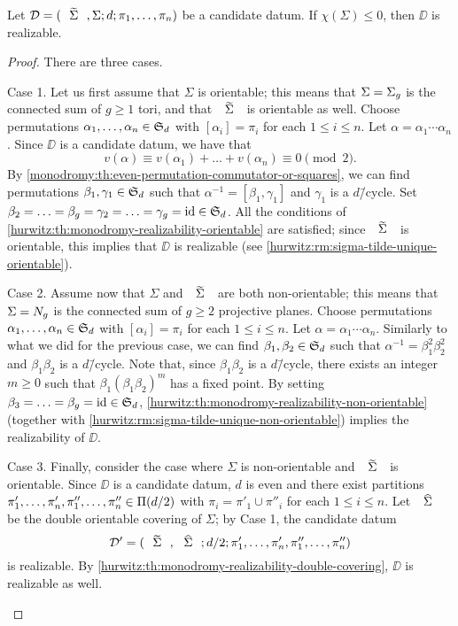 \begin{theorem}\label{monodromy:th:realizability-nonpositive-chi}
Let $\DD=\datum{\tSigma,\Sigma}{d}{\pi_1,\ldots,\pi_n}$ be a candidate datum. If $\chi(\Sigma)\le 0$, then $\DD$ is realizable.
\end{theorem}
\begin{proof}
There are three cases.
\begin{sideline}{Case 1.}
Let us first assume that $\Sigma$ is orientable; this means that $\Sigma=\Sigma_{g}$ is the connected sum of $g\ge 1$ tori, and that $\tSigma$ is orientable as well. Choose permutations $\alpha_1,\ldots,\alpha_n\in\symgroup[d]$ with $[\alpha_i]=\pi_i$ for each $1\le i\le n$. Let $\alpha=\alpha_1\cdots\alpha_n$. Since $\DD$ is a candidate datum, we have that
\[
v(\alpha)\equiv v(\alpha_1)+\ldots+v(\alpha_n)\equiv 0\pmod{2}.
\]
By \cref{monodromy:th:even-permutation-commutator-or-squares}, we can find permutations $\beta_1,\gamma_1\in\symgroup[d]$ such that $\alpha^{-1}=[\beta_1,\gamma_1]$ and $\gamma_1$ is a $d$\=/cycle. Set $\beta_2=\ldots=\beta_g=\gamma_2=\ldots=\gamma_g=\id\in\symgroup[d]$. All the conditions of \cref{hurwitz:th:monodromy-realizability-orientable} are satisfied; since $\tSigma$ is orientable, this implies that $\DD$ is realizable (see \cref{hurwitz:rm:sigma-tilde-unique-orientable}).
\end{sideline}
\begin{sideline}{Case 2.}
Assume now that $\Sigma$ and $\tSigma$ are both non-orientable; this means that $\Sigma=N_{g}$ is the connected sum of $g\ge 2$ projective planes. Choose permutations $\alpha_1,\ldots,\alpha_n\in\symgroup[d]$ with $[\alpha_i]=\pi_i$ for each $1\le i\le n$. Let $\alpha=\alpha_1\cdots\alpha_n$. Similarly to what we did for the previous case, we can find $\beta_1,\beta_2\in\symgroup[d]$ such that $\alpha^{-1}=\beta_1^2\beta_2^2$ and $\beta_1\beta_2$ is a $d$\=/cycle. Note that, since $\beta_1\beta_2$ is a $d$\=/cycle, there exists an integer $m\ge 0$ such that $\beta_1(\beta_1\beta_2)^m$ has a fixed point. By setting $\beta_3=\ldots=\beta_g=\id\in\symgroup[d]$, \cref{hurwitz:th:monodromy-realizability-non-orientable} (together with \cref{hurwitz:rm:sigma-tilde-unique-non-orientable}) implies the realizability of $\DD$.
\end{sideline}
\begin{sideline}{Case 3.}
Finally, consider the case where $\Sigma$ is non-orientable and $\tSigma$ is orientable. Since $\DD$ is a candidate datum, $d$ is even and there exist partitions $\pi'_1,\ldots,\pi'_n,\pi''_1,\ldots,\pi''_n\in\Pi(d/2)$ with $\pi_i=\pi'_1\cup\pi''_i$ for each $1\le i\le n$. Let $\hSigma$ be the double orientable covering of $\Sigma$; by Case 1, the candidate datum
\[
\DD'=\datum{\tSigma,\hSigma}{d/2}{\pi'_1,\ldots,\pi'_n,\pi''_1,\ldots,\pi''_n}
\]
is realizable. By \cref{hurwitz:th:monodromy-realizability-double-covering}, $\DD$ is realizable as well.\qedhere
\end{sideline}
\end{proof}

